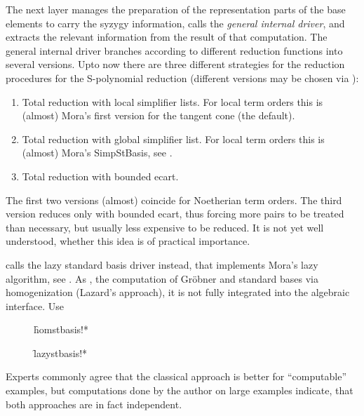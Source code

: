 The next layer manages the preparation of the representation parts
of the base elements to carry the syzygy information, calls the
\emph{general internal driver}, and extracts the relevant information
from the result of that computation. The general internal driver
branches according to different reduction functions into several
versions. Upto now there are three different strategies for the
reduction procedures for the S-polynomial reduction (different
versions may be chosen via ):
\begin{enumerate}
\item Total reduction with local simplifier lists. For local term
orders this is (almost) Mora's first version for the tangent cone (the
default).

\item Total reduction with global simplifier list. For local term
orders this is (almost) Mora's SimpStBasis, see \cite{MoraPfisterTraverso:92}.

\item Total reduction with bounded ecart.
\end{enumerate}
The first two versions (almost) coincide for Noetherian term
orders. The third version reduces only with bounded ecart, thus
forcing more pairs to be treated than necessary, but usually less
expensive to be reduced. It is not yet well understood, whether this
idea is of practical importance.

 calls the lazy standard basis driver instead,
that implements Mora's lazy algorithm, see \cite{MoraPfisterTraverso:92}. As
, the computation of Gr\"obner and standard bases via
homogenization (Lazard's approach), it is not fully integrated into
the algebraic interface. Use
\begin{description}

\item[]
  \begin{syntax}
    \f{homstbasis!*} 
  \end{syntax}
  \hypertarget{procedure:HOMSTBASIS!*}{}

\item[]
  \begin{syntax}
    \f{lazystbasis!*} 
  \end{syntax}
  \hypertarget{procedure:LAZYSTBASIS!*}{}
\end{description}
Experts commonly agree that the classical approach is better for
``computable'' examples, but computations done by the author
on large examples indicate, that both approaches are in fact
independent.
\medskip

